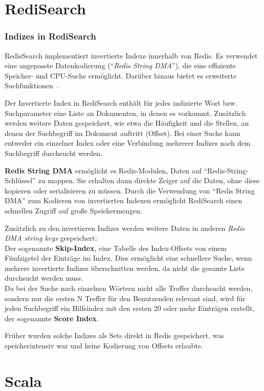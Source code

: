 
\section{RediSearch}

\subsubsection{Indizes in RediSearch}
RedisSearch implementiert invertierte Indexe innerhalb von Redis.
Es verwendet eine angepasste Datenkodierung (\enquote{\emph{Redis String DMA}}), die eine effiziente Speicher- und CPU-Suche ermöglicht.
Darüber hinaus bietet es erweiterte Suchfunktionen~\cite{redis_internal_nodate}.


Der Invertierte Index in RediSearch enthält für jedes indizierte Wort bzw. Suchparameter eine Liste an Dokumenten, in denen es vorkommt.
Zusätzlich werden weitere Daten gespeichert, wie etwa die Häufigkeit und die Stellen, an denen der Suchbegriff im Dokument auftritt (Offset).
Bei einer Suche kann entweder ein einzelner Index oder eine Verbindung mehrerer Indizes nach dem Suchbegriff durchsucht werden.

\textbf{Redis String DMA} ermöglicht es Redis-Modulen, Daten auf \enquote{Redis-String-Schlüssel} zu mappen. Sie erhalten dann direkte Zeiger auf die Daten, ohne diese kopieren oder serialisieren zu müssen.
Durch die Verwendung von \enquote{Redis String DMA} zum Kodieren von invertierten Indexen ermöglicht RediSearch einen schnellen Zugriff auf große Speichermengen.

Zusätzlich zu den invertieren Indizes werden weitere Daten in anderen \textit{Redis DMA string keys} gespeichert:\\
Der sogenannte \textbf{Skip-Index}, eine Tabelle des Index-Offsets von einem Fünfzigstel der Einträge im Index. Dies ermöglicht eine schnellere Suche, wenn mehrere invertierte Indizes überschnitten werden, da nicht die gesamte Liste durchsucht werden muss.\\
Da bei der Suche nach einzelnen Wörtern nicht alle Treffer durchsucht werden, sondern nur die ersten N Treffer für den Benutzenden relevant sind, wird für jeden Suchbegriff ein Hilfsindex mit den ersten 20 oder mehr Einträgen erstellt, der sogenannte \textbf{Score Index}.


Früher wurden solche Indizes als Sets direkt in Redis gespeichert, was speicherintensiv war und keine Kodierung von Offsets erlaubte.


\section{Scala}
